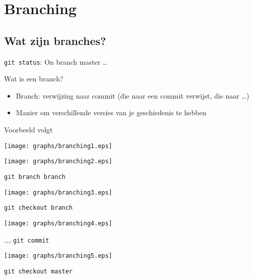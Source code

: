 \section{Branching}

\subsection{Wat zijn branches?}
\begin{frame}
	\texttt{git status}: On branch master \ldots
\end{frame}

\begin{frame}{Wat is een branch?}
	\begin{itemize}
		\item Branch: verwijzing naar commit (die naar een commit verwijst, die naar \ldots)
		\item Manier om verschillende versies van je geschiedenis te hebben
	\end{itemize}
	Voorbeeld volgt
\end{frame}

\begin{frame}
	\begin{center}
		\texttt{[image: graphs/branching1.eps]}
	\end{center}
\end{frame}

\begin{frame}
	\begin{center}
		\texttt{[image: graphs/branching2.eps]}
	\end{center}
	\texttt{git branch branch}
\end{frame}

\begin{frame}
	\begin{center}
		\texttt{[image: graphs/branching3.eps]}
	\end{center}
	\texttt{git checkout branch}
\end{frame}

\begin{frame}
	\begin{center}
		\texttt{[image: graphs/branching4.eps]}
	\end{center}
	\ldots, \texttt{git commit}
\end{frame}

\begin{frame}
	\begin{center}
		\texttt{[image: graphs/branching5.eps]}
	\end{center}
	\texttt{git checkout master}
\end{frame}

